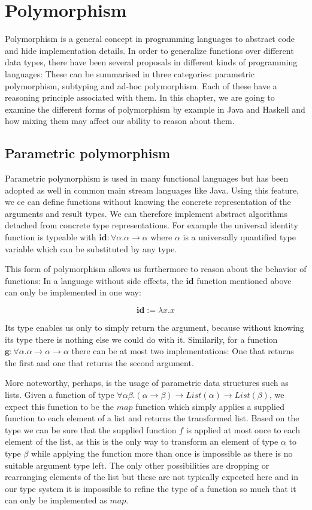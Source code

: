 \chapter{Polymorphism}
\label{ch:polymorphism}

Polymorphism is a general concept in programming languages to abstract code and hide implementation details.
In order to generalize functions over different data types, there have been several proposals in different kinds of programming languages:
These can be summarised in three categories: parametric polymorphism, subtyping and ad-hoc polymorphism.
Each of these have a reasoning principle associated with them.
In this chapter, we are going to examine the different forms of polymorphism by example in Java and Haskell and how mixing them may affect our ability to reason about them.

\section{Parametric polymorphism}\label{sec:parmetric-polymorphism}

Parametric polymorphism is used in many functional languages but has been adopted as well in common main stream languages like Java.
Using this feature, we ce can define functions without knowing the concrete representation of the arguments and result types.
We can therefore implement abstract algorithms detached from concrete type representations.
For example the universal identity function is typeable with $\mathbf{id} : \forall \alpha. \alpha \to \alpha$ where $\alpha$ is a universally quantified type variable which can be substituted by any type.

This form of polymorphism allows us furthermore to reason about the behavior of functions:
In a language without side effects, the $\mathbf{id}$ function mentioned above can only be implemented in one way:

$$
  \mathbf{id} := \lambda x.x
$$

Its type enables us only to simply return the argument, because without knowing its type there is nothing else we could do with it.
Similarily, for a function $\mathbf{g} : \forall \alpha. \alpha \to \alpha \to \alpha$ there can be at most two implementations:
One that returns the first and one that returns the second argument.

More noteworthy, perhaps, is the usage of parametric data structures such as lists.
Given a function of type $\forall \alpha \beta. (\alpha \to \beta) \to \mathit{List}(\alpha) \to \mathit{List}(\beta)$, we expect this function to be the $\mathit{map}$ function which simply applies a supplied function to each element of a list and returns the transformed list.
Based on the type we can be sure that the supplied function $f$ is applied at most once to each element of the list, as this is the only way to transform an element of type $\alpha$ to type $\beta$ while applying the function more than once is impossible as there is no suitable argument type left.
The only other possibilities are dropping or rearranging elements of the list but these are not typically expected here and in our type system it is impossible to refine the type of a function so much that it can only be implemented as $\mathit{map}$.

